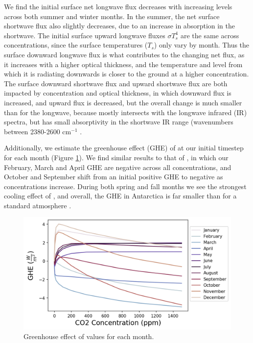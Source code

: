 \documentclass[12]{article}
\begin{document}
We find the initial surface net longwave flux decreases with increasing  levels across both summer and winter months. In the summer, the net surface shortwave flux also slightly decreases, due to an increase in  absorption in the shortwave.  The initial surface upward longwave fluxes $\sigma T_s^4$ are the same across  concentrations, since the surface temperatures ($T_s$) only vary by month. Thus the surface downward longwave flux is what contributes to the changing net flux, as it increases with a higher optical thickness, and the temperature and level from which it is radiating downwards is closer to the ground at a higher  concentration. The surface downward shortwave flux and upward shortwave flux are both impacted by  concentration and optical thickness, in which downward flux is increased, and upward flux is decreased, but the overall change is much smaller than for the longwave, because  mostly intersects with the longwave infrared (IR) spectra, but has small absorptivity in the shortwave IR range (wavenumbers between 2380-2600 cm$^{-1}$ \citep{mlawer_radiative_1997}. 

Additionally, we estimate the greenhouse effect (GHE) of  at our initial timestep for each month (Figure \ref{fig:GHE}). We find similar results to that of \citep{schmithusen_how_2015}, in which our February, March and April GHE are negative across all  concentrations, and October and September shift from an initial positive GHE to negative as concentrations increase. During both spring and fall months we see the strongest cooling effect of , and overall, the GHE in Antarctica is far smaller than for a standard atmosphere \citep{schmithusen_how_2015}.

\begin{figure}[htb!]
\noindent\includegraphics[width=.8\textwidth]{figures/GHE.png}
\centering
\caption{Greenhouse effect of  values for each month.}
\label{fig:GHE}
\end{figure}
\end{document}
